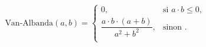 \begin{appendix}
\begin{equation*}
\text{Van-Albanda} (a,b)=\begin{cases}0, & \text{si } a \cdot b \leq 0, \\ 
\dfrac{ a \cdot b \cdot (a+b)}{ a^2 + b^2}, & \text{sinon }.\\
 \end{cases}
\end{equation*} 




%
%
%

\end{appendix}
